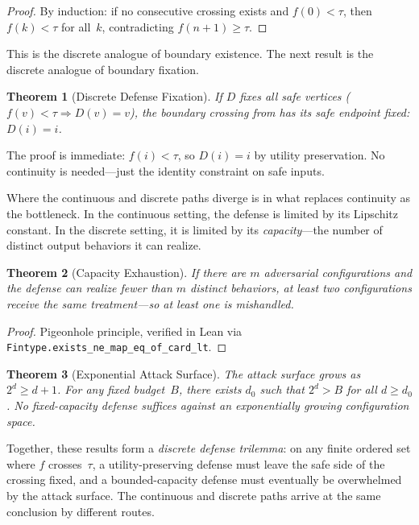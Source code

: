 \documentclass[11pt]{article}
\newtheorem{theorem}{Theorem}[section]
\begin{document}
\begin{proof}
By induction: if no consecutive crossing exists and $f(0) < \tau$,
then $f(k) < \tau$ for all~$k$, contradicting $f(n\!+\!1) \geq \tau$.
\end{proof}

This is the discrete analogue of boundary existence. The next result
is the discrete analogue of boundary fixation.

\begin{theorem}[Discrete Defense Fixation]
\label{thm:disc-defense}
If $D$ fixes all safe vertices ($f(v) < \tau \Rightarrow D(v) = v$),
the boundary crossing from  has its safe endpoint
fixed: $D(i) = i$.
\end{theorem}

The proof is immediate: $f(i) < \tau$, so $D(i) = i$ by
utility preservation. No continuity is needed---just the identity
constraint on safe inputs.

Where the continuous and discrete paths diverge is in what replaces
continuity as the bottleneck. In the continuous setting, the defense is
limited by its Lipschitz constant. In the discrete setting, it is
limited by its \emph{capacity}---the number of distinct output
behaviors it can realize.

\begin{theorem}[Capacity Exhaustion]
\label{thm:pigeonhole}
If there are $m$ adversarial configurations and the defense can realize
fewer than $m$ distinct behaviors, at least two configurations receive
the same treatment---so at least one is mishandled.
\end{theorem}

\begin{proof}
Pigeonhole principle, verified in Lean via
\texttt{Fintype.exists\_ne\_map\_eq\_of\_card\_lt}.
\end{proof}

\begin{theorem}[Exponential Attack Surface]
\label{thm:budget}
The attack surface grows as $2^d \geq d + 1$. For any fixed budget~$B$,
there exists $d_0$ such that $2^d > B$ for all $d \geq d_0$. No
fixed-capacity defense suffices against an exponentially growing
configuration space.
\end{theorem}

Together, these results form a \emph{discrete defense trilemma}: on any
finite ordered set where $f$ crosses~$\tau$, a utility-preserving
defense must leave the safe side of the crossing fixed, and a
bounded-capacity defense must eventually be overwhelmed by the attack
surface. The continuous and discrete paths arrive at the same conclusion
by different routes.
\end{document}
